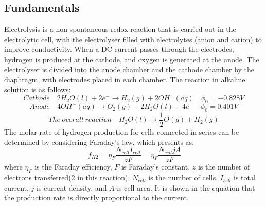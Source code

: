 \subsection{Fundamentals} 
Electrolysis is a non-spontaneous redox reaction that is carried out in the electrolytic cell, with the electrolyser filled with electrolytes (anion and cation) to improve conductivity. When a DC current passes through the electrodes, hydrogen is produced at the cathode, and oxygen is generated at the anode. The electrolyser is divided into the anode chamber and the cathode chamber by the diaphragm, with electrodes placed in each chamber. The reaction in alkaline solution is as follows:
\begin{equation} 
Cathode \quad 2H_2 O(l) + 2e^- \rightarrow H_2(g) + 2OH^-(aq)\quad   \phi_0=-0.828V
\end{equation} 
\begin{equation} 
Anode \quad 4OH^-(aq) \rightarrow O_2(g) +2H_2O(l) +4e^- \quad \phi_0=0.401V
\end{equation} 
\begin{equation} 
The \ overall \ reaction \quad H_2O(l) \rightarrow \frac{1}{2} O(g) + H_2(g) 
\end{equation} 
The molar rate of hydrogen production for cells connected in series can be determined by considering Faraday's law, which presents as:\cite{gibbs} 
\begin{equation} 
\ f_{H2} = \eta_F \frac{N_{cell}I_{cell}}{zF} =\eta_F\frac{N_{cell} jA}{zF} 
\end{equation} 
where $\eta_F$ is the Faraday efficiency, $F$ is Faraday's constant, $z$ is the number of electrons transferred(2 in this reaction). $N_{cell}$ is the number of cells, $I_{cell}$ is total current, $j$ is current density, and $A$ is cell area. It is shown in the equation that the production rate is directly proportional to the current.

